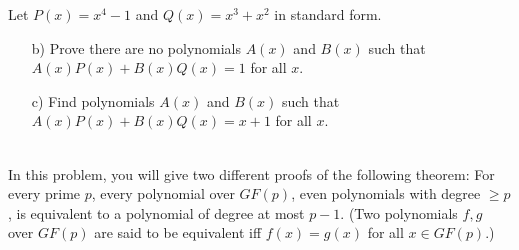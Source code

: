 \documentclass[]{article}
\newif\ifsolutions
\renewcommand{\answer}[1]{{\color{mydarkblue}\textbf{Solution:}#1}}
\begin{document}
\begin{qunlist}
\begin{itemize}
\end{itemize}


Let $P(x) = x^4 - 1$ and $Q(x) = x^3 + x^2$ in standard form.
\begin{itemize}
\qpart
\item[b)] Prove there are no polynomials $A(x)$ and $B(x)$ such that $A(x) P(x) + B(x) Q(x) = 1$ for all $x$.

\ifsolutions{ \answer { 
We can compute the GCD of $P(x)$ and $Q(x)$, and show that it is not $1$. 
Running the algorithm in (a), we get
\begin{align*}
gcd(x^4-1, \quad x^3+x^2)  \quad&//\quad x^4 - 1 = (x^3 + x^2)(x-1) + (x^2 -1) \\
gcd(x^3+x^2, \quad x^2-1)  \quad&//\quad x^3 + x^2 = (x^2-1)(x+1) + (x+1) \\
gcd(x^2-1, \quad x+1)  \quad&//\quad x^2 - 1 = (x+1)(x-1) + 0 \\
gcd(x+1, \quad 0)  \quad&//\quad D(x)=x+1
\end{align*}
Therefore $gcd(P(x), Q(x)) = x+1$, so there do not exist $A(x)$ and $B(x)$ such that $A(x) P(x) + B(x) Q(x) = 1$ $\forall x$.
}}\fi


\qpart
\item[c)] Find polynomials $A(x)$ and $B(x)$ such that $A(x) P(x) + B(x) Q(x) = x + 1$ for all $x$. 

\ifsolutions{ \answer {
Using extended gcd for polynomials, we can work our way backwards from the result of part (b) to find $A(x)$ and $B(x)$. We know that 
\[ x+1 = (x^3 + x^2) - (x+1)(x^2-1) \]
Plugging in the formula for $x^2-1$, we get
\begin{align*}
x+1 & = (x^3 + x^2) - (x+1)[(x^4 - 1) - (x^3 + x^2)(x-1)] \\
& = -(x+1)(x^4 - 1) + x^2(x^3+x^2) \end{align*}
So therefore, $A(x)=-(x+1)$ and $B(x)=x^2$.
}}\fi

\end{itemize}






 \\   %
In this problem, you will give two different proofs of the following theorem: For every prime $p$, every polynomial over $GF(p)$, even polynomials with degree $\geq p$, is equivalent to a polynomial of degree at most $p-1$. (Two polynomials $f,g$ over $GF(p)$ are said to be equivalent iff $f(x)=g(x)$ for all $x\in GF(p)$.)


\end{qunlist}
\end{document}

